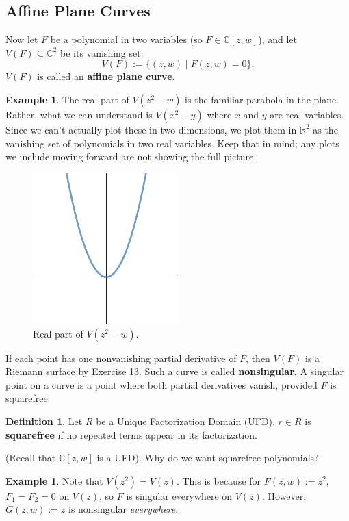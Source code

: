 \documentclass[12pt]{article}
\newcommand{\cx}{\mathbb{C}}
\newcommand{\real}{\mathbb{R}}
\newcommand{\ita}[1]{\textit{#1}}
\theoremstyle{definition}
\newtheorem{definition}[theorem]{Definition}
\newtheorem{example}[theorem]{Example}
\theoremstyle{remark}
\begin{document}
\subsection{Affine Plane Curves}
Now let $F$ be a polynomial in two variables (so $F\in\cx[z,w]$), and let $V(F)\subseteq\cx^2$ be its vanishing set:
\begin{equation}
    V(F):=\{(z,w)\mid F(z,w)=0\}.
\end{equation}
$V(F)$ is called an \textbf{affine plane curve}.
\begin{example}
    The real part of $V(z^2-w)$ is the familiar parabola in the plane. Rather, what we can understand is $V(x^2-y)$ where $x$ and $y$ are real variables. Since we can't actually plot these in two dimensions, we plot them in $\real^2$ as the vanishing set of polynomials in two real variables. Keep that in mind; any plots we include moving forward are not showing the full picture.
    \begin{figure}[H]
        \centering
        \includegraphics[width=0.5\textwidth]{6.png}
        \caption{Real part of $V(z^2-w)$.}
        \label{fig:Fig6}
    \end{figure}
\end{example}
If each point has one nonvanishing partial derivative of $F$, then $V(F)$ is a Riemann surface by Exercise 13. Such a curve is called \textbf{nonsingular}. A singular point on a curve is a point where both partial derivatives vanish, provided $F$ is \underline{squarefree}.
\begin{definition}
    Let $R$ be a Unique Factorization Domain (UFD). $r\in R$ is \textbf{squarefree} if no repeated terms appear in its factorization.
\end{definition}
(Recall that $\cx[z,w]$ is a UFD). Why do we want squarefree polynomials? 
\begin{example}
    Note that $V(z^2)=V(z)$. This is because for $F(z,w):=z^2$, $F_1=F_2=0$ on $V(z)$, so $F$ is singular everywhere on $V(z)$. However, $G(z,w):=z$ is nonsingular \ita{everywhere}.
\end{example}
\end{document}
